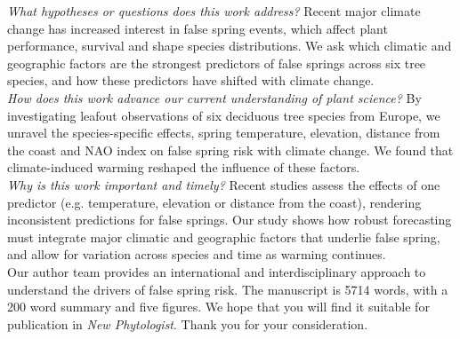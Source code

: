 \documentclass[11pt,a4paper]{article}\usepackage[]{graphicx}\usepackage[]{color}
\begin{document}
\noindent \textit{What hypotheses or questions does this work address?} Recent major climate change has increased interest in false spring events, which affect plant performance, survival and shape species distributions. We ask which climatic and geographic factors are the strongest predictors of false springs across six tree species, and how these predictors have shifted with climate change. \\

\noindent \textit{How does this work advance our current understanding of plant science?} By investigating leafout observations of six deciduous tree species from Europe, we unravel the species-specific effects, spring temperature, elevation, distance from the coast and NAO index on false spring risk with climate change. We found that climate-induced warming reshaped the influence of these factors. \\

\noindent \textit{Why is this work important and timely?} Recent studies assess the effects of one predictor (e.g. temperature, elevation or distance from the coast), rendering inconsistent predictions for false springs. Our study shows how robust forecasting must integrate major climatic and geographic factors that underlie false spring, and allow for variation across species and time as warming continues. \\

\noindent Our author team provides an international and interdisciplinary approach to understand the drivers of false spring risk. The manuscript is 5714 words, with a 200 word summary and five figures. We hope that you will find it suitable for publication in \textit{New Phytologist}. Thank you for your consideration. \\
\end{document}
